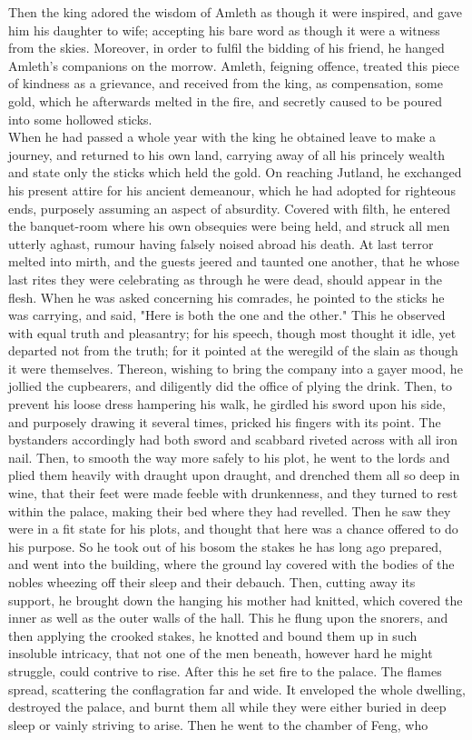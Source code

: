 \documentclass[10pt,a4paper]{report}
\begin{document}
Then the king adored the wisdom of Amleth as though it were inspired, and gave him his daughter to wife; accepting his bare word as though it were a witness from the skies. Moreover, in order to fulfil the bidding of his friend, he hanged Amleth's companions on the morrow. Amleth, feigning offence, treated this piece of kindness as a grievance, and received from the king, as compensation, some gold, which he afterwards melted in the fire, and secretly caused to be poured into some hollowed sticks.\\

When he had passed a whole year with the king he obtained leave to make a journey, and returned to his own land, carrying away of all his princely wealth and state only the sticks which held the gold. On reaching Jutland, he exchanged his present attire for his ancient demeanour, which he had adopted for righteous ends, purposely assuming an aspect of absurdity. Covered with filth, he entered the banquet-room where his own obsequies were being held, and struck all men utterly aghast, rumour having falsely noised abroad his death. At last terror melted into mirth, and the guests jeered and taunted one another, that he whose last rites they were celebrating as through he were dead, should appear in the flesh. When he was asked concerning his comrades, he pointed to the sticks he was carrying, and said, "Here is both the one and the other." This he observed with equal truth and pleasantry; for his speech, though most thought it idle, yet departed not from the truth; for it pointed at the weregild of the slain as though it were themselves. Thereon, wishing to bring the company into a gayer mood, he jollied the cupbearers, and diligently did the office of plying the drink. Then, to prevent his loose dress hampering his walk, he girdled his sword upon his side, and purposely drawing it several times, pricked his fingers with its point. The bystanders accordingly had both sword and scabbard riveted across with all iron nail. Then, to smooth the way more safely to his plot, he went to the lords and plied them heavily with draught upon draught, and drenched them all so deep in wine, that their feet were made feeble with drunkenness, and they turned to rest within the palace, making their bed where they had revelled. Then he saw they were in a fit state for his plots, and thought that here was a chance offered to do his purpose. So he took out of his bosom the stakes he has long ago prepared, and went into the building, where the ground lay covered with the bodies of the nobles wheezing off their sleep and their debauch. Then, cutting away its support, he brought down the hanging his mother had knitted, which covered the inner as well as the outer walls of the hall. This he flung upon the snorers, and then applying the crooked stakes, he knotted and bound them up in such insoluble intricacy, that not one of the men beneath, however hard he might struggle, could contrive to rise. After this he set fire to the palace. The flames spread, scattering the conflagration far and wide. It enveloped the whole dwelling, destroyed the palace, and burnt them all while they were either buried in deep sleep or vainly striving to arise. Then he went to the chamber of Feng, who 
\end{document}
